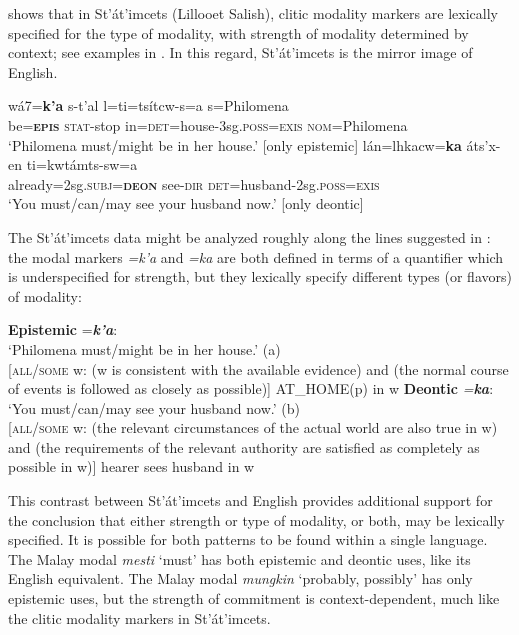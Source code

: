 \citet{Matthewson2010} shows that in St’át’imcets (Lillooet Salish), clitic modality markers are lexically specified for the type of modality, with strength of modality determined by context; see examples in . In this regard, St’át’imcets is the mirror image of English.


\ea \label{ex:16.25}
\ea   \gll wá7=\textbf{k’a}  s-t’al  l=ti=tsítcw-s=a  s=Philomena\\
be=\textbf{\textsc{epis}}  \textsc{stat}-stop  in=\textsc{det}=house-3sg.\textsc{poss}=\textsc{exis}  \textsc{nom}=Philomena\\
\glt ‘Philomena must/might be in her house.’   [only epistemic]
\ex \gll lán=lhkacw=\textbf{ka}  áts’x-en  ti=kwtámts-sw=a\\
already=2sg.\textsc{subj}=\textbf{\textsc{deon}}  see-\textsc{dir}  \textsc{det}=husband-2sg.\textsc{poss}=\textsc{exis}\\
\glt ‘You must/can/may see your husband now.’   [only deontic]
\z \z


The St’át’imcets data might be analyzed roughly along the lines suggested in : the modal markers \textit{=k’a} and \textit{=ka} are both defined in terms of a quantifier which is underspecified for strength, but they lexically specify different types (or flavors) of modality:


\ea \label{ex:16.26}
\ea 
\textbf{Epistemic} =\textbf{\textit{k’a}}:\\
‘Philomena must/might be in her house.’ (a)\\
{}[\textsc{all/some} w: (w is consistent with the available evidence) and (the normal course of events is followed as closely as possible)] AT\_HOME(p) in w
\ex 
 \textbf{Deontic} \textit{=}\textbf{\textit{ka}}:\\
‘You must/can/may see your husband now.’ (b)\\
{}[\textsc{all/some} w: (the relevant circumstances of the actual world are also true in w) and (the requirements of the relevant authority are satisfied as completely as possible in w)] hearer sees husband in w
\z \z


This contrast between St’át’imcets and English provides additional support for the conclusion that either strength or type of modality, or both, may be lexically specified. It is possible for both patterns to be found within a single language. The Malay modal \textit{mesti} ‘must’ has both epistemic and deontic uses, like its English equivalent. The Malay modal \textit{mungkin} ‘probably, possibly’ has only epistemic uses, but the strength of commitment is context-dependent, much like the clitic modality markers in St’át’imcets.

